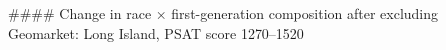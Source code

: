 #### Change in race × first-generation composition after excluding Geomarket: Long Island, PSAT score 1270–1520
